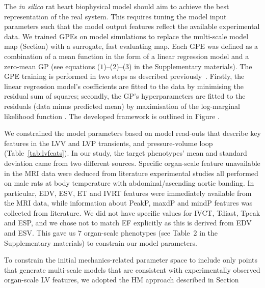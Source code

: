 \vspace{0.2cm}
The \textit{in silico} rat heart biophysical model should aim to achieve the best representation of the real system. This requires tuning the model input parameters such that the model output features reflect the available experimental data. We trained GPEs on model simulations to replace the multi-scale model map (Section) with a surrogate, fast evaluating map. Each GPE was defined as a combination of a mean function in the form of a linear regression model and a zero-mean GP (see equations ($1$)--($2$)--($3$) in the Supplementary materials). The GPE training is performed in two steps as described previously~\cite{Vernon:2010,Vernon:2018}. Firstly, the linear regression model's coefficients are fitted to the data by minimising the residual sum of squares; secondly, the GP's hyperparameters are fitted to the residuals (data minus predicted mean) by maximisation of the log-marginal likelihood function . The developed framework is outlined in Figure .

\vspace{0.2cm}
We constrained the model parameters based on model read-outs that describe key features in the LVV and LVP transients, and pressure-volume loop (Table~\ref{tab:lvfeats}). In our study, the target phenotypes' mean and standard deviation came from two different sources. Specific organ-scale feature unavailable in the MRI data \cite{Roe:2017} were deduced from literature experimental studies all performed on male rats at body temperature with abdominal/ascending aortic banding. In particular, EDV, ESV, ET and IVRT features were immediately available from the MRI data, while information about PeakP, maxdP and mindP features was collected from literature. We did not have specific values for IVCT, Tdiast, Tpeak and ESP, and we chose not to match EF explicitly as this is derived from EDV and ESV. This gave us $7$ organ-scale phenotypes (see Table~$2$ in the Supplementary materials) to constrain our model parameters.


\vspace{0.2cm}
To constrain the initial mechanics-related parameter space to include only points that generate multi-scale models that are consistent with experimentally observed organ-scale LV features, we adopted the HM approach described in Section

